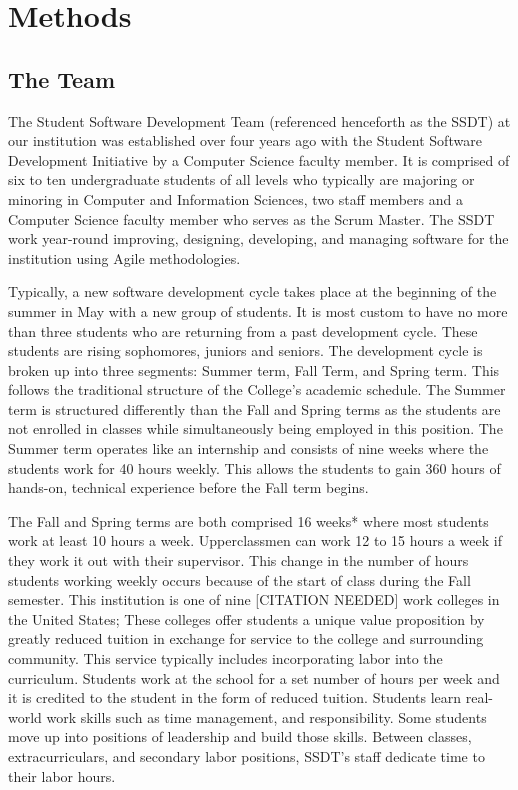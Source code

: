 \section{Methods}
\subsection{The Team}
The Student Software Development Team (referenced henceforth as the SSDT) at our institution was established over four years ago with the Student Software Development Initiative by a Computer Science faculty member. It is comprised of six to ten undergraduate students of all levels who typically are majoring or minoring in Computer and Information Sciences, two staff members and a Computer Science faculty member who serves as the Scrum Master.  The SSDT work year-round improving, designing, developing, and managing software for the institution using Agile methodologies.

Typically, a new software development cycle takes place at the beginning of the summer in May with a new group of students. It is most custom to have no more than three students who are returning from a past development cycle. These students are rising sophomores, juniors and seniors. The development cycle is broken up into three segments: Summer term, Fall Term, and Spring term. This follows the traditional structure of the College's academic schedule. The Summer term is structured differently than the Fall and Spring terms as the students are not enrolled in classes while simultaneously being employed in this position. The Summer term operates like an internship and consists of nine weeks where the students work for 40 hours weekly. This allows the students to gain 360 hours of hands-on, technical experience before the Fall term begins.

The Fall and Spring terms are both comprised 16 weeks* where most students work at least 10 hours a week. Upperclassmen can work 12 to 15 hours a week if they work it out with their supervisor. This change in the number of hours students working weekly occurs because of the start of class during the Fall semester. This institution is one of nine [CITATION NEEDED] work colleges in the United States; These colleges offer students a unique value proposition by greatly reduced tuition in exchange for service to the college and surrounding community. This service typically includes incorporating labor into the curriculum. Students work at the school for a set number of hours per week and it is credited to the student in the form of reduced tuition. Students learn real-world work skills such as time management, and responsibility. Some students move up into positions of leadership and build those skills. Between classes, extracurriculars, and secondary labor positions, SSDT's staff dedicate time to their labor hours.

